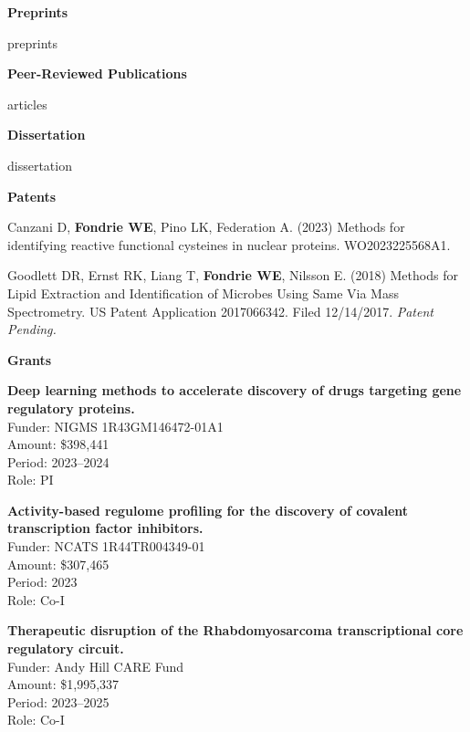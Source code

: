\documentclass[11pt]{article}
\newcommand{\mysection}[1]{\vspace{1ex} \textbf{\large \textsf{#1} \quad \hrulefill}}
\begin{document}
\newpage
{%
\mysection{Preprints}
\begin{etaremune}
{{ preprints }}
\end{etaremune}
{%

\mysection{Peer-Reviewed Publications}

\begin{etaremune}
{{ articles }}
\end{etaremune}

\mysection{Dissertation}
\begin{etaremune}
{{ dissertation }}
\end{etaremune}

\mysection{Patents}
\begin{etaremune}
  \item Canzani D, \textbf{Fondrie WE}, Pino LK, Federation A. (2023) Methods for identifying reactive functional cysteines in nuclear proteins. WO2023225568A1.

  \item Goodlett DR, Ernst RK, Liang T, \textbf{Fondrie WE}, Nilsson E. (2018)
  Methods for Lipid Extraction and Identification of Microbes Using Same Via
  Mass Spectrometry. US Patent Application 2017066342. Filed 12/14/2017. {\it
    Patent Pending.}
\end{etaremune}

\mysection{Grants}
\begin{etaremune}
  \item \textbf{Deep learning methods to accelerate discovery of drugs targeting gene regulatory proteins.} \\
  Funder: NIGMS 1R43GM146472-01A1 \\
  Amount: \$398,441\\
  Period: 2023--2024 \\
  Role: PI \\

  \item \textbf{Activity-based regulome profiling for the discovery of covalent transcription factor inhibitors.} \\
  Funder: NCATS 1R44TR004349-01 \\
  Amount: \$307,465\\
  Period: 2023 \\
  Role: Co-I

  \item \textbf{Therapeutic disruption of the Rhabdomyosarcoma transcriptional core regulatory circuit.} \\
  Funder: Andy Hill CARE Fund \\
  Amount: \$1,995,337\\
  Period: 2023--2025 \\
  Role: Co-I


\end{etaremune}}}
\end{document}

